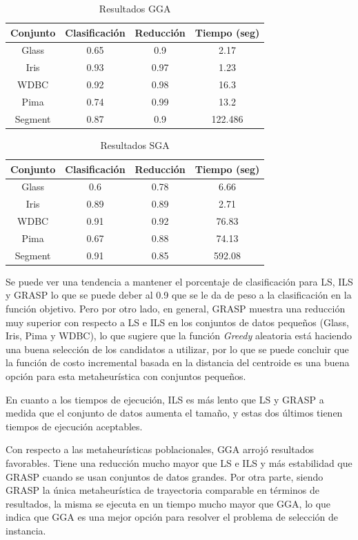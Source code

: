 \documentclass{ci5652}
\begin{document}
\begin{table}[!h]
	\centering
	\begin{tabular}{c c c c}
	\hline
	Conjunto & Clasificación & Reducción & Tiempo (seg) \\
	\hline
	Glass & 0.65 & 0.9 & 2.17 \\
	Iris & 0.93 & 0.97 & 1.23 \\
	WDBC & 0.92 & 0.98 & 16.3 \\
	Pima & 0.74 & 0.99 & 13.2 \\
	Segment & 0.87 & 0.9 & 122.486 \\
	\end{tabular}
	\caption{Resultados GGA}
	\label{table:gga-result}
\end{table}

\begin{table}[!h]
	\centering
	\begin{tabular}{c c c c}
	\hline
	Conjunto & Clasificación & Reducción & Tiempo (seg) \\
	\hline
	Glass & 0.6 & 0.78 & 6.66 \\
	Iris & 0.89 & 0.89 & 2.71 \\
	WDBC & 0.91 & 0.92 & 76.83 \\
	Pima & 0.67 & 0.88 & 74.13 \\
	Segment & 0.91 & 0.85 & 592.08 \\
	\end{tabular}
	\caption{Resultados SGA}
	\label{table:sga-result}
\end{table}


Se puede ver una tendencia a mantener el porcentaje de clasificación para LS, ILS y GRASP lo que se puede deber al 0.9 que se le da de peso a la clasificación en la función objetivo. Pero por otro lado, en general, GRASP muestra una reducción muy superior con respecto a LS e ILS en los conjuntos de datos pequeños (Glass, Iris, Pima y WDBC), lo que sugiere que la función \textit{Greedy} aleatoria está haciendo una buena selección de los candidatos a utilizar, por lo que se puede concluir que la función de costo incremental basada en la distancia del centroide es una buena opción para esta metaheurística con conjuntos pequeños.

En cuanto a los tiempos de ejecución, ILS es más lento que LS y GRASP a medida que el conjunto de datos aumenta el tamaño, y estas dos últimos tienen tiempos de ejecución aceptables.

Con respecto a las metaheurísticas poblacionales, GGA arrojó resultados favorables. Tiene una reducción mucho mayor que LS e ILS y más estabilidad que GRASP cuando se usan conjuntos de datos grandes. Por otra parte, siendo GRASP la única metaheurística de trayectoria comparable en términos de resultados, la misma se ejecuta en un tiempo mucho mayor que GGA, lo que indica que GGA es una mejor opción para resolver el problema de selección de instancia.
\end{document}
